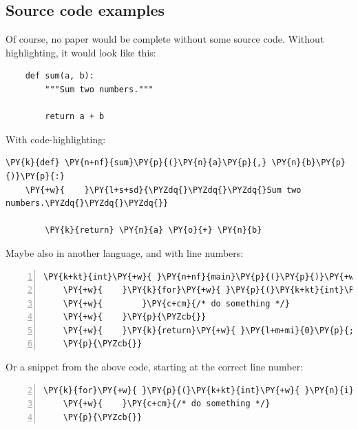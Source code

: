 \subsection{Source code examples \label{source-code-examples}}

Of course, no paper would be complete without some source code.  Without
highlighting, it would look like this:

\begin{verbatim}
    def sum(a, b):
        """Sum two numbers."""

        return a + b
\end{verbatim}

With code-highlighting:

\vspace{1mm}
\begin{Verbatim}[commandchars=\\\{\},fontsize=\footnotesize]
    \PY{k}{def} \PY{n+nf}{sum}\PY{p}{(}\PY{n}{a}\PY{p}{,} \PY{n}{b}\PY{p}{)}\PY{p}{:}
    \PY{+w}{    }\PY{l+s+sd}{\PYZdq{}\PYZdq{}\PYZdq{}Sum two numbers.\PYZdq{}\PYZdq{}\PYZdq{}}

        \PY{k}{return} \PY{n}{a} \PY{o}{+} \PY{n}{b}
\end{Verbatim}
\vspace{1mm}

Maybe also in another language, and with line numbers:

\vspace{1mm}
\begin{Verbatim}[commandchars=\\\{\},numbers=left,firstnumber=1,stepnumber=1,fontsize=\footnotesize,xleftmargin=2.25mm,numbersep=3pt]
    \PY{k+kt}{int}\PY{+w}{ }\PY{n+nf}{main}\PY{p}{(}\PY{p}{)}\PY{+w}{ }\PY{p}{\PYZob{}}
    \PY{+w}{    }\PY{k}{for}\PY{+w}{ }\PY{p}{(}\PY{k+kt}{int}\PY{+w}{ }\PY{n}{i}\PY{+w}{ }\PY{o}{=}\PY{+w}{ }\PY{l+m+mi}{0}\PY{p}{;}\PY{+w}{ }\PY{n}{i}\PY{+w}{ }\PY{o}{\PYZlt{}}\PY{+w}{ }\PY{l+m+mi}{10}\PY{p}{;}\PY{+w}{ }\PY{n}{i}\PY{o}{+}\PY{o}{+}\PY{p}{)}\PY{+w}{ }\PY{p}{\PYZob{}}
    \PY{+w}{        }\PY{c+cm}{/* do something */}
    \PY{+w}{    }\PY{p}{\PYZcb{}}
    \PY{+w}{    }\PY{k}{return}\PY{+w}{ }\PY{l+m+mi}{0}\PY{p}{;}
    \PY{p}{\PYZcb{}}
\end{Verbatim}
\vspace{1mm}

Or a snippet from the above code, starting at the correct line number:
\vspace{1mm}
\begin{Verbatim}[commandchars=\\\{\},numbers=left,firstnumber=2,stepnumber=1,fontsize=\footnotesize,xleftmargin=2.25mm,numbersep=3pt]
    \PY{k}{for}\PY{+w}{ }\PY{p}{(}\PY{k+kt}{int}\PY{+w}{ }\PY{n}{i}\PY{+w}{ }\PY{o}{=}\PY{+w}{ }\PY{l+m+mi}{0}\PY{p}{;}\PY{+w}{ }\PY{n}{i}\PY{+w}{ }\PY{o}{\PYZlt{}}\PY{+w}{ }\PY{l+m+mi}{10}\PY{p}{;}\PY{+w}{ }\PY{n}{i}\PY{o}{+}\PY{o}{+}\PY{p}{)}\PY{+w}{ }\PY{p}{\PYZob{}}
    \PY{+w}{    }\PY{c+cm}{/* do something */}
    \PY{p}{\PYZcb{}}
\end{Verbatim}
\vspace{1mm}


